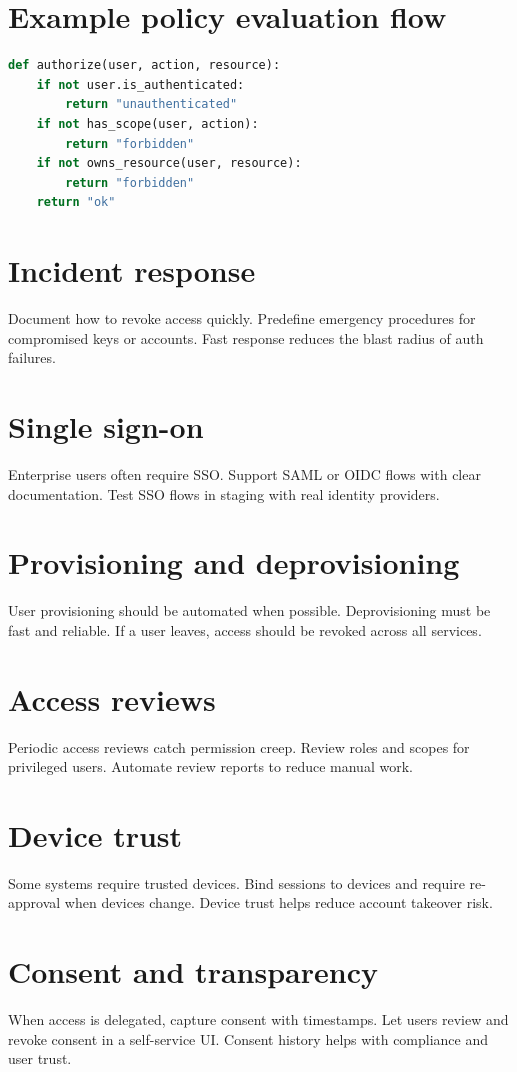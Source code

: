 \section{Example policy evaluation flow}
\begin{lstlisting}[language=Python]
def authorize(user, action, resource):
    if not user.is_authenticated:
        return "unauthenticated"
    if not has_scope(user, action):
        return "forbidden"
    if not owns_resource(user, resource):
        return "forbidden"
    return "ok"
\end{lstlisting}

\section{Incident response}
Document how to revoke access quickly.
Predefine emergency procedures for compromised keys or accounts.
Fast response reduces the blast radius of auth failures.

\section{Single sign-on}
Enterprise users often require SSO.
Support SAML or OIDC flows with clear documentation.
Test SSO flows in staging with real identity providers.

\section{Provisioning and deprovisioning}
User provisioning should be automated when possible.
Deprovisioning must be fast and reliable.
If a user leaves, access should be revoked across all services.

\section{Access reviews}
Periodic access reviews catch permission creep.
Review roles and scopes for privileged users.
Automate review reports to reduce manual work.

\section{Device trust}
Some systems require trusted devices.
Bind sessions to devices and require re-approval when devices change.
Device trust helps reduce account takeover risk.

\section{Consent and transparency}
When access is delegated, capture consent with timestamps.
Let users review and revoke consent in a self-service UI.
Consent history helps with compliance and user trust.

